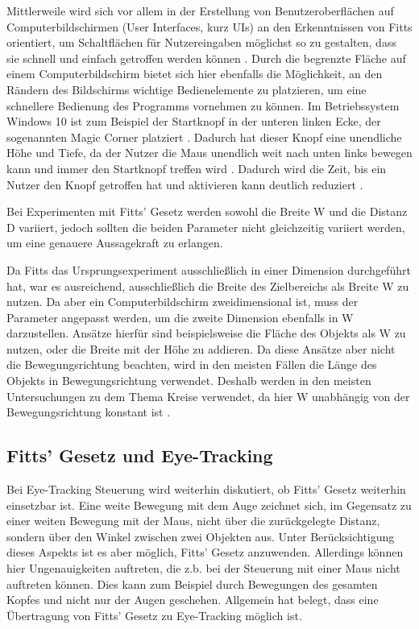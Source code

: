 Mittlerweile wird sich vor allem in der Erstellung von Benutzeroberflächen auf Computerbildschirmen (User Interfaces, kurz UIs) an den Erkenntnissen von Fitts  orientiert, um Schaltflächen für Nutzereingaben möglichst so zu gestalten, dass sie schnell und einfach getroffen werden können \cite{Kexugit.2006}. Durch die begrenzte Fläche auf einem Computerbildschirm bietet sich hier ebenfalls die Möglichkeit, an den Rändern des Bildschirms wichtige Bedienelemente zu platzieren, um eine schnellere Bedienung des Programms vornehmen zu können. Im Betriebssystem Windows 10 ist zum Beispiel der Startknopf in der unteren linken Ecke, der sogenannten \glqq Magic Corner \grqq{} platziert \cite{Kexugit.2006}. Dadurch hat dieser Knopf eine \glqq unendliche\grqq{} Höhe und Tiefe, da der Nutzer die Maus unendlich weit nach unten links bewegen kann und immer den Startknopf treffen wird \cite{Kexugit.2006}. Dadurch wird die Zeit, bis ein Nutzer den Knopf getroffen hat und aktivieren kann deutlich reduziert \cite{Soukoreff.2004}.

Bei Experimenten mit Fitts' Gesetz werden sowohl die Breite W und die Distanz D variiert, jedoch sollten die beiden Parameter nicht gleichzeitig variiert werden, um eine genauere Aussagekraft zu erlangen. 

Da Fitts das Ursprungsexperiment ausschließlich in einer Dimension durchgeführt hat, war es ausreichend, ausschließlich die Breite des Zielbereichs als Breite W zu nutzen. Da aber ein Computerbildschirm zweidimensional ist, muss der Parameter angepasst werden, um die zweite Dimension ebenfalls in W darzustellen. Ansätze hierfür sind beispielsweise die Fläche des Objekts als W zu nutzen, oder die Breite mit der Höhe zu addieren. Da diese Ansätze aber nicht die Bewegungsrichtung beachten, wird in den meisten Fällen die Länge des Objekts in Bewegungsrichtung verwendet. Deshalb werden in den meisten Untersuchungen zu dem Thema Kreise verwendet, da hier W unabhängig von der Bewegungsrichtung konstant ist \cite{Soukoreff.2004}. 

\subsection{Fitts' Gesetz und Eye-Tracking}
Bei Eye-Tracking Steuerung wird weiterhin diskutiert, ob Fitts' Gesetz weiterhin einsetzbar ist. Eine weite Bewegung mit dem Auge zeichnet sich, im Gegensatz zu einer weiten Bewegung mit der Maus, nicht über die zurückgelegte Distanz, sondern über den Winkel zwischen zwei Objekten aus. Unter Berücksichtigung dieses Aspekts ist es aber möglich, Fitts' Gesetz anzuwenden. Allerdings können hier Ungenauigkeiten auftreten, die z.b. bei der Steuerung mit einer Maus nicht auftreten können. Dies kann zum Beispiel durch Bewegungen des gesamten Kopfes und nicht nur der Augen geschehen. Allgemein hat \citeauthor{Miniotas.2000} belegt, dass eine Übertragung von Fitts' Gesetz zu Eye-Tracking möglich ist. \cite{Miniotas.2000}

